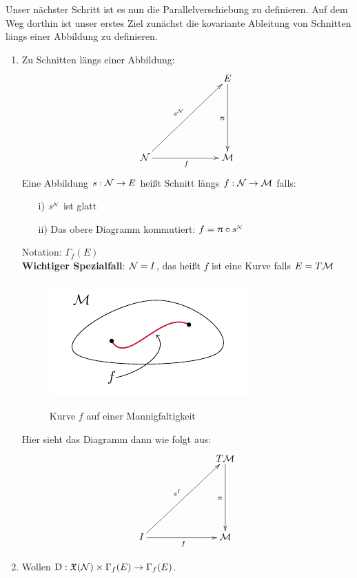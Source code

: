 
Unser nächster Schritt ist es nun die Parallelverschiebung zu definieren.
Auf dem Weg dorthin ist unser erstes Ziel zunächst die kovariante Ableitung von Schnitten längs einer Abbildung zu definieren.
\begin{enumerate}
\item Zu Schnitten längs einer Abbildung:
\begin{align}
\begin{xy}
  \xymatrix@=0.2\linewidth{
          &   E \ar[d]_{\pi} \\
      \mfka \ar[ur]^{s^\text{{\begin{tiny}$\mfka$\end{tiny}}}}  \ar[r]_f  &   \mfk
  }
\end{xy}
\end{align}
Eine Abbildung $s: \mathcal{N} \to E$ heißt Schnitt längs $f: \mathcal{N} \to \mathcal{M}$ falls:
\begin{enumerate}
  \item[i)]  $s^\text{{\begin{tiny}$\mfka$\end{tiny}}}$ ist glatt
  \item[ii)]  Das obere Diagramm kommutiert: $f = \pi \circ s^\text{{\begin{tiny}$\mfka$\end{tiny}}}$
\end{enumerate}
Notation: $\Gamma_f (E)$\\
\textbf{Wichtiger Spezialfall}: $\mathcal{N} = I$, das heißt $f$ ist eine Kurve falls $E = T\mathcal{M}$
\begin{figure}[H]
\centering
\includegraphics[width=0.4\linewidth]{figures/tikz/curve_on_manifold.pdf}
\label{img:curve_on_manifold}
\caption{Kurve $f$ auf einer Mannigfaltigkeit}
\end{figure} 
Hier sieht das Diagramm dann wie folgt aus:
\begin{align}
\begin{xy}
  \xymatrix@=0.2\linewidth{
          &   T\mfk \ar[d]_{\pi} \\
      I \ar[ur]^{s^I} \ar[r]_f  &   \mfk
  }
\end{xy}
\end{align}
\item Wollen $\mathrm{D}: \mathfrak{X}(\mathcal{N}) \times \Gamma_f (E) \to \Gamma_f (E)$.
\end{enumerate}
